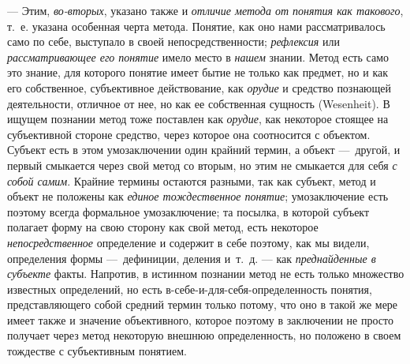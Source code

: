 \documentclass[twoside]{article}
\begin{document}
— Этим, {\em во-вторых},
указано также и
{\em отличие метода от понятия как
такового}, т.~е. указана особенная черта метода. Понятие,
как оно нами рассматривалось само по себе, выступало в своей
непосредственности; {\em рефлексия}
или {\em рассматривающее
его понятие }имело место в
{\em нашем} знании. Метод
есть само это знание, для которого понятие имеет бытие не только как
предмет, но и как его собственное, субъективное действование, как
{\em орудие} и средство
познающей деятельности, отличное от нее, но как ее собственная сущность
(Wesenheit). В ищущем познании метод тоже поставлен как
{\em орудие}, как
некоторое стоящее на субъективной стороне средство, через которое она
соотносится с объектом. Субъект есть в этом умозаключении один крайний
термин, а объект —~другой, и первый смыкается через свой
метод со вторым, но этим не смыкается для себя
{\em с собой самим}.
Крайние термины остаются разными, так как субъект, метод и
объект не положены как {\em единое
тождественное понятие}; умозаключение есть поэтому всегда
формальное умозаключение; та посылка, в которой субъект полагает форму на
свою сторону как свой метод, есть некоторое
{\em непосредственное}
определение и содержит в себе поэтому, как мы видели,
определения формы —~дефиниции, деления и~т.~д. —
как {\em преднайденные в
субъекте} факты. Напротив, в истинном познании метод не есть
только множество известных определений, но есть
в-себе-и-для-себя-определенность понятия, представляющего собой средний
термин только потому, что оно в такой же мере имеет также и значение
объективного, которое поэтому в заключении не просто получает через метод
некоторую внешнюю определенность, но положено в своем тождестве с
субъективным понятием.
\end{document}
